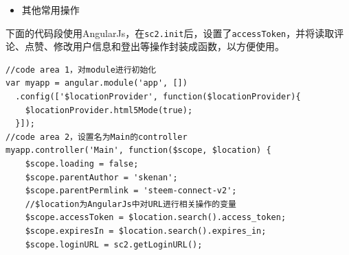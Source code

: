 \documentclass[]{ctexbook}
\providecommand{\tightlist}{%
  \setlength{\itemsep}{0pt}\setlength{\parskip}{0pt}}
\begin{document}
\begin{itemize}
\tightlist
\item
  其他常用操作
\end{itemize}

下面的代码段使用AngularJs，在\texttt{sc2.init}后，设置了\texttt{accessToken}，并将读取评论、点赞、修改用户信息和登出等操作封装成函数，以方便使用。

\begin{verbatim}
//code area 1，对module进行初始化
var myapp = angular.module('app', [])
  .config(['$locationProvider', function($locationProvider){
    $locationProvider.html5Mode(true);
  }]);
//code area 2，设置名为Main的controller
myapp.controller('Main', function($scope, $location) {
    $scope.loading = false;
    $scope.parentAuthor = 'skenan';
    $scope.parentPermlink = 'steem-connect-v2';
    //$location为AngularJs中对URL进行相关操作的变量
    $scope.accessToken = $location.search().access_token;
    $scope.expiresIn = $location.search().expires_in;
    $scope.loginURL = sc2.getLoginURL();


\end{verbatim}
\end{document}
